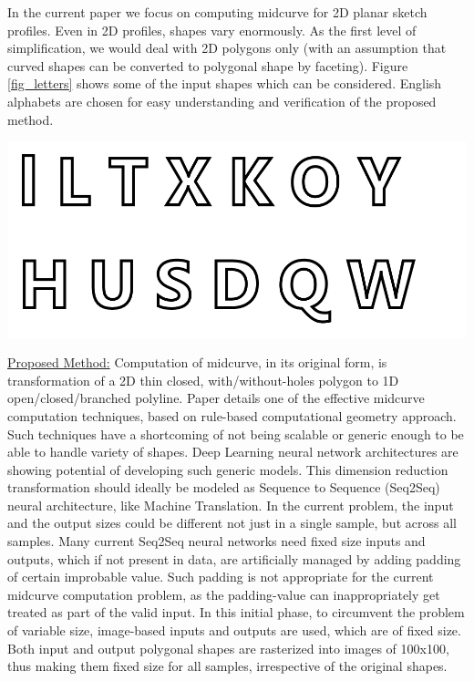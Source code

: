 \documentclass{article}
\begin{document}
In the current paper we focus on computing midcurve for 2D planar sketch profiles.  Even in 2D profiles, shapes vary enormously. As the first level of simplification, we would deal with 2D polygons only (with an assumption that curved shapes can be converted to polygonal shape by faceting). Figure \ref{fig_letters} shows some of the input shapes which can be considered. English alphabets are chosen for easy understanding and verification of the proposed method.

     \begin{center}
	\includegraphics[width=0.6\linewidth]{images/Letters}
	\label{fig_letters}
    \end{center}


\vspace{10pt}
\noindent\underline{Proposed Method:}\vspace{0.2em}\newline
Computation of midcurve, in its original form, is transformation of a 2D thin closed, with/without-holes polygon to 1D open/closed/branched polyline. Paper \cite{dimred2017} details one of the effective midcurve computation techniques, based on rule-based computational geometry approach. Such techniques have a shortcoming of not being scalable or generic enough to be able to handle variety of shapes. Deep Learning neural network architectures are showing potential of developing such generic models. This dimension reduction transformation should ideally be modeled as Sequence to Sequence (Seq2Seq) neural architecture, like Machine Translation. In the current problem, the input and the output sizes could be different not just in a single sample, but across all samples. Many current Seq2Seq neural networks need fixed size inputs and outputs, which if not present in data, are artificially managed by adding padding of certain improbable value. Such padding is not appropriate for the current midcurve computation problem, as the padding-value can inappropriately get treated as part of the valid input. In this initial phase, to circumvent the problem of variable size, image-based inputs and outputs are used, which are of fixed size. Both input and output polygonal shapes are rasterized into images of 100x100, thus making them fixed size for all samples, irrespective of the original shapes.
\end{document}

